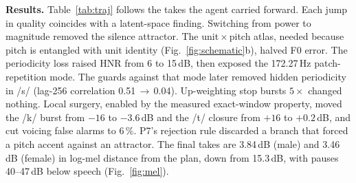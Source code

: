 \documentclass[10pt,twocolumn]{article}
\renewcommand{\paragraph}[1]{\smallskip\noindent\textbf{#1}\;}
\begin{document}
\begin{table}[t]
\centering\small
{}
\vspace{-0.4em}
\caption{Trajectory of the carried-forward takes, all re-measured with one script. F0 error is measured against the planned contour. FA = voicing false alarms. Natural modal voice has an HNR of roughly 15--25\,dB.}
\label{tab:traj}
\vspace{-1em}
\end{table}

\paragraph{Results.} Table~\ref{tab:traj} follows the takes the agent carried forward. Each jump in quality coincides with a latent-space finding. Switching from power to magnitude removed the silence attractor. The unit\,$\times$\,pitch atlas, needed because pitch is entangled with unit identity (Fig.~\ref{fig:schematic}b), halved F0 error. The periodicity loss raised HNR from 6 to 15\,dB, then exposed the 172.27\,Hz patch-repetition mode. The guards against that mode later removed hidden periodicity in /s/ (lag-256 correlation 0.51\,$\to$\,0.04). Up-weighting stop bursts $5\times$ changed nothing. Local surgery, enabled by the measured exact-window property, moved the /k/ burst from $-16$ to $-3.6$\,dB and the /t/ closure from $+16$ to $+0.2$\,dB, and cut voicing false alarms to 6\,\%. P7's rejection rule discarded a branch that forced a pitch accent against an attractor. The final takes are 3.84\,dB (male) and 3.46\,dB (female) in log-mel distance from the plan, down from 15.3\,dB, with pauses 40--47\,dB below speech (Fig.~\ref{fig:mel}).
\end{document}
